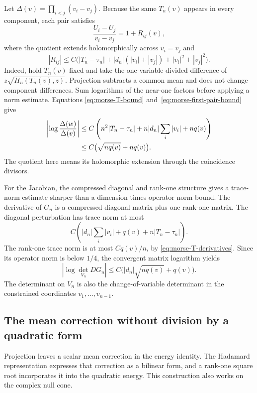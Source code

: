 \documentclass[11pt]{article}
\numberwithin{equation}{section}
\theoremstyle{definition}
\begin{document}
Let $\Delta(v)=\prod_{i<j}(v_i-v_j)$.  Because the same $T_n(v)$
appears in every component, each pair satisfies
\begin{equation}
 \frac{U_i-U_j}{v_i-v_j}=1+R_{ij}(v),
 \label{eq:morse-first-divided}
\end{equation}
where the quotient extends holomorphically across $v_i=v_j$ and
\begin{equation}
 |R_{ij}|
 \le C\bigl(|T_n-\tau_n|+|d_n|(|v_i|+|v_j|)
                    +|v_i|^2+|v_j|^2\bigr).
 \label{eq:morse-first-pair-bound}
\end{equation}
Indeed, hold $T_n(v)$ fixed and take the one-variable divided difference
of $z\sqrt{H_n(T_n(v),z)}$.  Projection subtracts a common mean and does
not change component differences.  Sum logarithms of the near-one
factors before applying a norm estimate.  Equations
\eqref{eq:morse-T-bound} and~\eqref{eq:morse-first-pair-bound} give
\begin{align}
 \left|\log\frac{\Delta(w)}{\Delta(v)}\right|
 &\le C\left(n^2|T_n-\tau_n|
         +n|d_n|\sum_i|v_i|+nq(v)\right)\notag\\
 &\le C\bigl(\sqrt{nq(v)}+nq(v)\bigr).
 \label{eq:morse-first-vandermonde}
\end{align}
The quotient here means its holomorphic extension through the coincidence
divisors.

For the Jacobian, the compressed diagonal and rank-one structure gives
a trace-norm estimate sharper than a dimension times operator-norm bound.  The derivative of
$G_n$ is a compressed diagonal matrix plus one rank-one matrix.  The
diagonal perturbation has trace norm at most
\[
 C\left(|d_n|\sum_i|v_i|+q(v)+n|T_n-\tau_n|\right).
\]
The rank-one trace norm is at most $Cq(v)/n$, by
\eqref{eq:morse-T-derivatives}.  Since its operator norm is below $1/4$,
the convergent matrix logarithm yields
\begin{equation}
 |\log\det_{V_n}DG_n|
 \le C\bigl(|d_n|\sqrt{nq(v)}+q(v)\bigr).
 \label{eq:morse-first-jacobian}
\end{equation}
The determinant on $V_n$ is also the change-of-variable determinant in
the constrained coordinates $v_1,\ldots,v_{n-1}$.

\subsection{The mean correction without division by a quadratic form}

Projection leaves a scalar mean correction in the energy identity.
The Hadamard representation expresses that correction as a bilinear
form, and a rank-one square root incorporates it into the quadratic
energy. This construction also works on the complex null cone.
\end{document}
